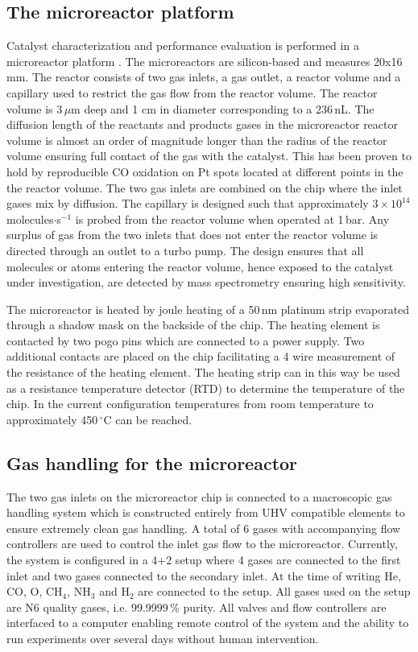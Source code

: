 \documentclass[aip,rsi]{revtex4-1}
\begin{document}
\subsection{The microreactor platform}
Catalyst characterization and performance evaluation is performed in a microreactor platform \cite{Henriksen2009}. The microreactors are silicon-based and measures 20x16\,mm. The reactor consists of two gas inlets, a gas outlet, a reactor volume and a capillary used to restrict the gas flow from the reactor volume. The reactor volume is 3\,$\mu$m deep and 1 cm in diameter corresponding to a 236\,nL. The diffusion length of the reactants and products gases in the microreactor reactor volume is almost an order of magnitude longer than the radius of the reactor volume ensuring full contact of the gas with the catalyst. This has been proven to hold by reproducible CO oxidation on Pt spots located at different points in the the reactor volume. The two gas inlets are combined on the chip where the inlet gases mix by diffusion. The capillary is designed such that approximately $3\times10^{14}$\,molecules$\cdot$s$^{-1}$ is probed from the reactor volume when operated at 1\,bar. Any surplus of gas from the two inlets that does not enter the reactor volume is directed through an outlet to a turbo pump. The design ensures that all molecules or atoms entering the reactor volume, hence exposed to the catalyst under investigation, are detected by mass spectrometry ensuring high sensitivity. 

The microreactor is heated by joule heating of a 50\,nm platinum strip evaporated through a shadow mask on the backside of the chip. The heating element is contacted by two pogo pins which are connected to a power supply. Two additional contacts are placed on the chip facilitating a 4 wire measurement of the resistance of the heating element. The heating strip can in this way be used as a resistance temperature detector (RTD) to determine the temperature of the chip. In the current configuration temperatures from room temperature to approximately 450\,$^{\circ}$C can be reached.


\subsection{Gas handling for the microreactor}
The two gas inlets on the microreactor chip is connected to a macroscopic gas handling system which is constructed entirely from UHV compatible elements to ensure extremely clean gas handling. A total of 6 gases with accompanying flow controllers are used to control the inlet gas flow to the microreactor. Currently, the system is configured in a 4+2 setup where 4 gases are connected to the first inlet and two gases connected to the secondary inlet. At the time of writing He, CO, O, CH$_4$, NH$_3$ and H$_2$ are connected to the setup. All gases used on the setup are N6 quality gases, i.e. 99.9999\,\% purity. All valves and flow controllers are interfaced to a computer enabling remote control of the system and the ability to run experiments over several days without human intervention.
\end{document}
